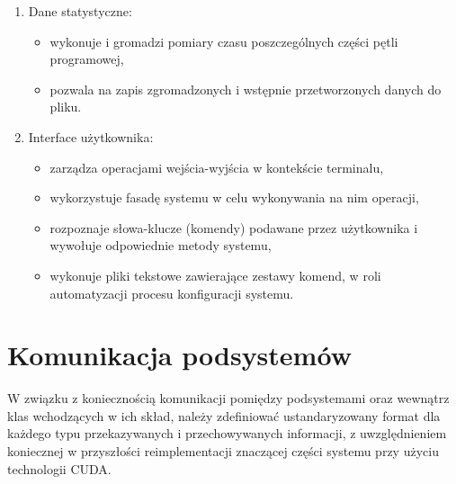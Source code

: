 \begin{enumerate}
\begin{itemize}
        \end{itemize}
    \item Dane statystyczne:
        \begin{itemize}
            \item wykonuje i gromadzi pomiary czasu poszczególnych części pętli programowej,
            \item pozwala na zapis zgromadzonych i wstępnie przetworzonych danych do pliku.
        \end{itemize}
    \item Interface użytkownika:
        \begin{itemize}
            \item zarządza operacjami wejścia-wyjścia w kontekście terminalu,
            \item wykorzystuje fasadę systemu w celu wykonywania na nim operacji,
            \item rozpoznaje słowa-klucze (komendy) podawane przez użytkownika i wywołuje odpowiednie metody systemu,
            \item wykonuje pliki tekstowe zawierające zestawy komend, w roli automatyzacji procesu konfiguracji systemu.
        \end{itemize}
\end{enumerate}

\section{Komunikacja podsystemów}
W związku z koniecznością komunikacji pomiędzy podsystemami oraz wewnątrz klas wchodzących w ich skład, należy zdefiniować ustandaryzowany format dla każdego typu przekazywanych i przechowywanych informacji, z uwzględnieniem koniecznej w przyszłości reimplementacji znaczącej części systemu przy użyciu technologii CUDA\cite{bib:CUDA}.

